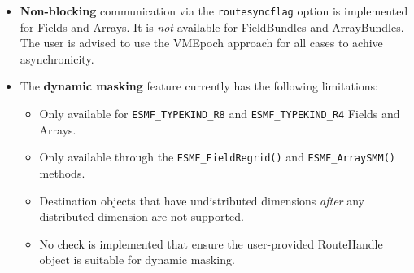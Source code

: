 
\begin{itemize}

\item {\bf Non-blocking} communication via the {\tt routesyncflag} option is implemented for Fields and Arrays. It is {\em not} available for FieldBundles and ArrayBundles. The user is advised to use the VMEpoch approach for all cases to achive asynchronicity.

\item The {\bf dynamic masking} feature currently has the following limitations:

\begin{itemize}

\item Only available for {\tt ESMF\_TYPEKIND\_R8} and {\tt ESMF\_TYPEKIND\_R4} Fields and Arrays.

\item Only available through the {\tt ESMF\_FieldRegrid()} and {\tt ESMF\_ArraySMM()} methods.

\item Destination objects that have undistributed dimensions {\em after} any distributed dimension are not supported.

\item No check is implemented that ensure the user-provided RouteHandle object is suitable for dynamic masking.

\end{itemize}


\end{itemize}
